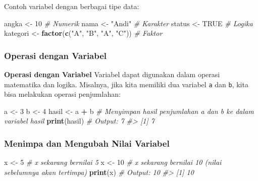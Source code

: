 \documentclass[
  oneside]{book}
\newenvironment{Shaded}{\begin{snugshade}}{\end{snugshade}}
\newcommand{\CommentTok}[1]{\textcolor[rgb]{0.56,0.35,0.01}{\textit{#1}}}
\newcommand{\ConstantTok}[1]{\textcolor[rgb]{0.56,0.35,0.01}{#1}}
\newcommand{\DecValTok}[1]{\textcolor[rgb]{0.00,0.00,0.81}{#1}}
\newcommand{\FunctionTok}[1]{\textcolor[rgb]{0.13,0.29,0.53}{\textbf{#1}}}
\newcommand{\NormalTok}[1]{#1}
\newcommand{\OtherTok}[1]{\textcolor[rgb]{0.56,0.35,0.01}{#1}}
\newcommand{\SpecialCharTok}[1]{\textcolor[rgb]{0.81,0.36,0.00}{\textbf{#1}}}
\newcommand{\StringTok}[1]{\textcolor[rgb]{0.31,0.60,0.02}{#1}}
\begin{document}
Contoh variabel dengan berbagai tipe data:

\begin{Shaded}
\begin{Highlighting}[]
\NormalTok{angka }\OtherTok{\textless{}{-}} \DecValTok{10}          \CommentTok{\# Numerik}
\NormalTok{nama }\OtherTok{\textless{}{-}} \StringTok{"Andi"}       \CommentTok{\# Karakter}
\NormalTok{status }\OtherTok{\textless{}{-}} \ConstantTok{TRUE}       \CommentTok{\# Logika}
\NormalTok{kategori }\OtherTok{\textless{}{-}} \FunctionTok{factor}\NormalTok{(}\FunctionTok{c}\NormalTok{(}\StringTok{"A"}\NormalTok{, }\StringTok{"B"}\NormalTok{, }\StringTok{"A"}\NormalTok{, }\StringTok{"C"}\NormalTok{))  }\CommentTok{\# Faktor}
\end{Highlighting}
\end{Shaded}

\subsubsection*{Operasi dengan Variabel}\label{operasi-dengan-variabel}

\textbf{Operasi dengan Variabel} Variabel dapat digunakan dalam operasi
matematika dan logika. Misalnya, jika kita memiliki dua variabel \texttt{a} dan
\texttt{b}, kita bisa melakukan operasi penjumlahan:

\begin{Shaded}
\begin{Highlighting}[]
\NormalTok{a }\OtherTok{\textless{}{-}} \DecValTok{3}
\NormalTok{b }\OtherTok{\textless{}{-}} \DecValTok{4}
\NormalTok{hasil }\OtherTok{\textless{}{-}}\NormalTok{ a }\SpecialCharTok{+}\NormalTok{ b  }\CommentTok{\# Menyimpan hasil penjumlahan a dan b ke dalam variabel hasil}
\FunctionTok{print}\NormalTok{(hasil)    }\CommentTok{\# Output: 7}
\CommentTok{\#\textgreater{} [1] 7}
\end{Highlighting}
\end{Shaded}

\subsubsection*{Menimpa dan Mengubah Nilai Variabel}\label{menimpa-dan-mengubah-nilai-variabel}

\begin{Shaded}
\begin{Highlighting}[]
\NormalTok{x }\OtherTok{\textless{}{-}} \DecValTok{5}      \CommentTok{\# x sekarang bernilai 5}
\NormalTok{x }\OtherTok{\textless{}{-}} \DecValTok{10}     \CommentTok{\# x sekarang bernilai 10 (nilai sebelumnya akan tertimpa)}
\FunctionTok{print}\NormalTok{(x)    }\CommentTok{\# Output: 10}
\CommentTok{\#\textgreater{} [1] 10}
\end{Highlighting}
\end{Shaded}
\end{document}
